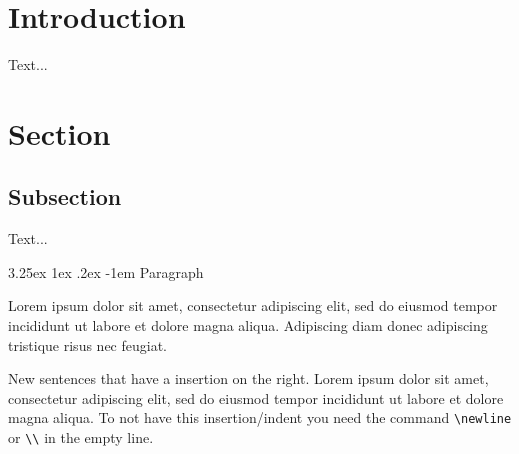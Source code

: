 \documentclass{article}				%
\title{\mytitle}	%
\author{\myauthor}	%
\date{\mydate}		%
\makeatletter
\renewcommand\paragraph{\@startsection{paragraph}{5}{\z@}%
	{3.25ex \@plus1ex \@minus.2ex}%
	{-1em}%
	{\normalfont\normalsize\bfseries}}
\makeatother
\begin{document}
\thispagestyle{empty}

\maketitle

\begin{abstract}
\centering %
Short summary of the document aka abstract.
\end{abstract}

\tableofcontents

\thispagestyle{fancy} %


\section{Introduction}

Text...

\section{Section}

\subsection{Subsection}

Text...

\paragraph{Paragraph}

Lorem ipsum dolor sit amet, consectetur adipiscing elit, sed do eiusmod tempor incididunt ut labore et dolore magna aliqua. Adipiscing diam donec adipiscing tristique risus nec feugiat.

New sentences that have a insertion on the right. Lorem ipsum dolor sit amet, consectetur adipiscing elit, sed do eiusmod tempor incididunt ut labore et dolore magna aliqua.
\newline
To not have this insertion/indent you need the command \verb|\newline|
\\
or \verb|\\| in the empty line.
\end{document}
